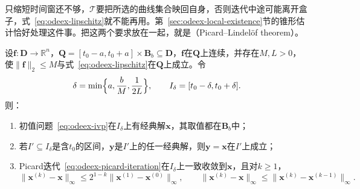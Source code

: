 只缩短时间窗还不够，$\mathcal{T}$要把所选的曲线集合映回自身，否则迭代中途可能离开盒子，式~\eqref{eq:odeex-lipschitz}就不能再用。第~\ref{sec:odeex-local-existence}节的锥形估计恰好处理这件事。把这两个要求放在一起，就是（Picard--Lindelöf theorem）。

\begin{theorem}
\label{thm:odeex-picard-lindelof}
设$\bm{f}:\bm{D}\to\mathbb{R}^{n}$，$\bm{Q}=[t_0-a,t_0+a]\times\bm{B}_b\subseteq\bm{D}$，$\bm{f}$在$\bm{Q}$上连续，并存在$M,L>0$，使$\lVert\bm{f}\rVert_2\leq M$与式~\eqref{eq:odeex-lipschitz}在$\bm{Q}$上成立。令
\begin{equation}
 \delta=\min\Bigl\{a,\frac{b}{M},\frac{1}{2L}\Bigr\},\qquad I_\delta=[t_0-\delta,t_0+\delta].
 \label{eq:odeex-picard-window}
\end{equation}
则：
\begin{enumerate}
 \item 初值问题~\eqref{eq:odeex-ivp}在$I_\delta$上有经典解$\bm{x}$，其取值都在$\bm{B}_b$中；
 \item 若$I'\subseteq I_\delta$是含$t_0$的区间，$\bm{y}$是$I'$上的任一经典解，则$\bm{y}=\bm{x}$在$I'$上成立；
 \item Picard迭代~\eqref{eq:odeex-picard-iteration}在$I_\delta$上一致收敛到$\bm{x}$，且对$k\geq1$，
 \begin{equation}
 \lVert\bm{x}^{(k)}-\bm{x}\rVert_{\infty}\leq2^{1-k}\lVert\bm{x}^{(1)}-\bm{x}^{(0)}\rVert_{\infty},\qquad
 \lVert\bm{x}^{(k)}-\bm{x}\rVert_{\infty}\leq\lVert\bm{x}^{(k)}-\bm{x}^{(k-1)}\rVert_{\infty}.
 \label{eq:odeex-picard-error}
 \end{equation}
\end{enumerate}
\end{theorem}

